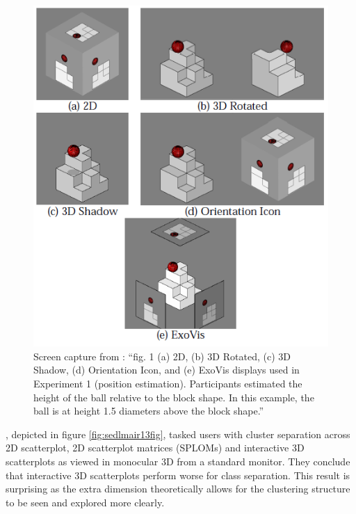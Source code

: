 \documentclass{monashthesis}
\begin{document}
\begin{figure}

{\centering \includegraphics[width=0.5\linewidth]{./figures/tory06fig} 

}

\caption{Screen capture from
\textcite{tory_visualization_2006}: ``fig. 1 (a) 2D, (b) 3D Rotated, (c)
3D Shadow, (d) Orientation Icon, and (e) ExoVis displays used in
Experiment 1 (position estimation). Participants estimated the height of
the ball relative to the block shape. In this example, the ball is at
height 1.5 diameters above the block shape.''}\label{fig:tory06fig}
\end{figure}

\textcite{sedlmair_empirical_2013}, depicted in figure
\ref{fig:sedlmair13fig}, tasked users with cluster separation across 2D
scatterplot, 2D scatterplot matrices (SPLOMs) and interactive 3D
scatterplots as viewed in monocular 3D from a standard monitor. They
conclude that interactive 3D scatterplots perform worse for class
separation. This result is surprising as the extra dimension
theoretically allows for the clustering structure to be seen and
explored more clearly.
\end{document}
